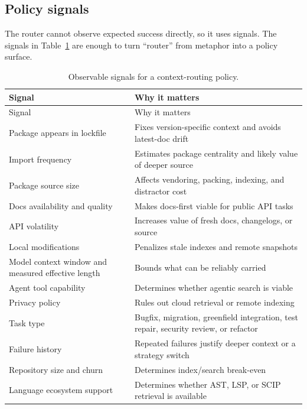 \documentclass[
  11pt,
  letterpaper,
  numbers=noendperiod,
  parskip=half]{scrartcl}
\begin{document}
\subsection{Policy signals}\label{sec-policy-signals}

The router cannot observe expected success directly, so it uses signals.
The signals in Table~\ref{tbl-signals} are enough to turn ``router''
from metaphor into a policy surface.

\begin{longtable}[]{@{}
  >{\raggedright\arraybackslash}p{}
  >{\raggedright\arraybackslash}p{}@{}}
\caption{Observable signals for a context-routing
policy.}\label{tbl-signals}\tabularnewline
\toprule\noalign{}
\begin{minipage}[b]{\linewidth}\raggedright
Signal
\end{minipage} & \begin{minipage}[b]{\linewidth}\raggedright
Why it matters
\end{minipage} \\
\midrule\noalign{}
\endfirsthead
\toprule\noalign{}
\begin{minipage}[b]{\linewidth}\raggedright
Signal
\end{minipage} & \begin{minipage}[b]{\linewidth}\raggedright
Why it matters
\end{minipage} \\
\midrule\noalign{}
\endhead
\bottomrule\noalign{}
\endlastfoot
Package appears in lockfile & Fixes version-specific context and avoids
latest-doc drift \\
Import frequency & Estimates package centrality and likely value of
deeper source \\
Package source size & Affects vendoring, packing, indexing, and
distractor cost \\
Docs availability and quality & Makes docs-first viable for public API
tasks \\
API volatility & Increases value of fresh docs, changelogs, or source \\
Local modifications & Penalizes stale indexes and remote snapshots \\
Model context window and measured effective length & Bounds what can be
reliably carried \\
Agent tool capability & Determines whether agentic search is viable \\
Privacy policy & Rules out cloud retrieval or remote indexing \\
Task type & Bugfix, migration, greenfield integration, test repair,
security review, or refactor \\
Failure history & Repeated failures justify deeper context or a strategy
switch \\
Repository size and churn & Determines index/search break-even \\
Language ecosystem support & Determines whether AST, LSP, or SCIP
retrieval is available \\
\end{longtable}
\end{document}
